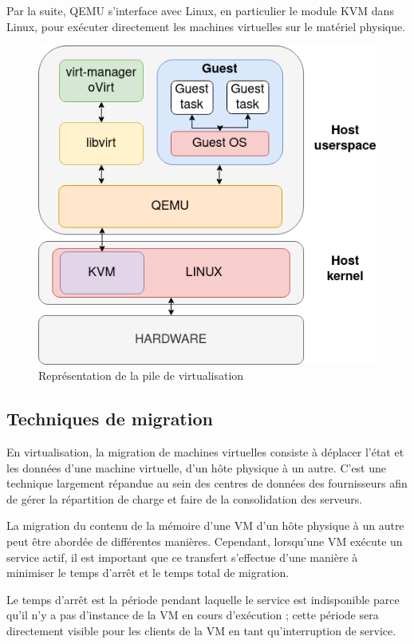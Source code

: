 Par la suite, QEMU s'interface avec Linux, en particulier le module KVM dans Linux, pour exécuter directement les machines virtuelles sur le matériel physique. 

\begin{figure}[H]
    \centering
    \includegraphics[scale=0.5]{include/pile.png}
    \caption{Représentation de la pile de virtualisation}
\end{figure}



\subsection{Techniques de migration}
En virtualisation, la migration de machines virtuelles consiste à déplacer l'état et les données d'une machine virtuelle, d'un hôte physique à un autre.
C'est une technique largement répandue au sein des centres de données des fournisseurs afin de gérer la répartition de charge et faire de la consolidation des serveurs.

La migration du contenu de la mémoire d'une VM d'un hôte physique à un autre peut être abordée de différentes manières.
Cependant, lorsqu'une VM exécute un service actif, il est important que ce transfert s'effectue d'une manière à minimiser le temps d'arrêt et le temps total de migration.

Le temps d'arrêt est la période pendant laquelle le service est indisponible parce qu'il n'y a pas d'instance de la VM en cours d'exécution ; cette période sera directement visible pour les clients de la VM en tant qu'interruption de service.

